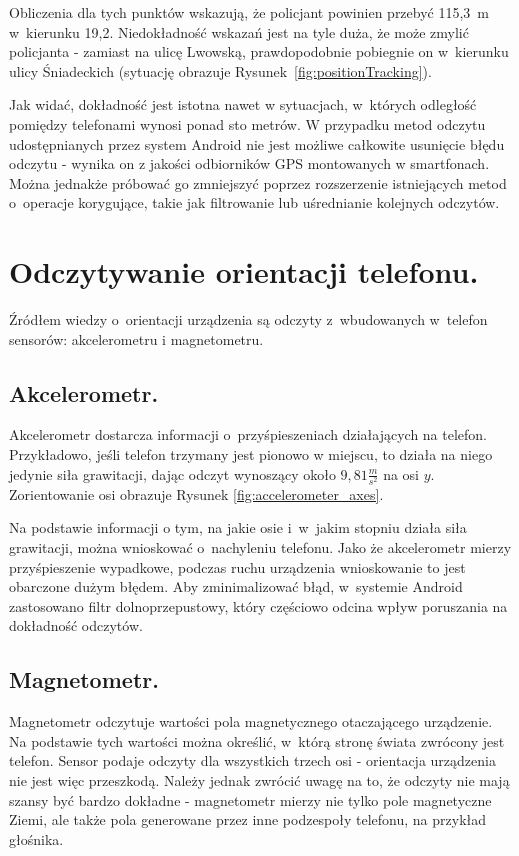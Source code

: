 \documentclass[a4paper,twocolumn,11pt]{article}
\begin{document}
 Obliczenia dla tych punktów wskazują, że policjant powinien przebyć 115,3~m w~kierunku 19,2\textdegree.
 Niedokładność wskazań jest na tyle duża, że może zmylić policjanta - zamiast na ulicę Lwowską, prawdopodobnie pobiegnie on w~kierunku ulicy Śniadeckich (sytuację obrazuje Rysunek~\ref{fig:positionTracking}).


 
 Jak widać, dokładność jest istotna nawet w sytuacjach, w~których odległość pomiędzy telefonami wynosi ponad sto metrów.
 W przypadku metod odczytu udostępnianych przez system Android nie jest możliwe całkowite usunięcie błędu odczytu - wynika on z jakości odbiorników GPS montowanych w smartfonach. Można jednakże próbować go zmniejszyć poprzez rozszerzenie istniejących metod o~operacje korygujące, takie jak filtrowanie lub uśrednianie kolejnych odczytów.




\section{Odczytywanie orientacji telefonu.} \label{sec:orientation_tracking}

Źródłem wiedzy o~orientacji urządzenia są odczyty z~wbudowanych w~telefon sensorów: akcelerometru i magnetometru.


\subsection{Akcelerometr.}
 Akcelerometr dostarcza informacji o~przyśpieszeniach działających na telefon.
 Przykładowo, jeśli telefon trzymany jest pionowo w miejscu, to działa na niego jedynie siła grawitacji, dając odczyt wynoszący około $9,81\frac{m}{s^2}$ na osi $y$.
 Zorientowanie osi obrazuje Rysunek \ref{fig:accelerometer_axes}.
 
 

 Na podstawie informacji o tym, na jakie osie i~w~jakim stopniu działa siła grawitacji, można wnioskować o~nachyleniu telefonu.
 Jako że akcelerometr mierzy przyśpieszenie wypadkowe, podczas ruchu urządzenia wnioskowanie to jest obarczone dużym błędem.
 Aby zminimalizować błąd, w~systemie Android zastosowano filtr dolnoprzepustowy, który częściowo odcina wpływ poruszania na dokładność odczytów.


\subsection{Magnetometr.}
 Magnetometr odczytuje wartości pola magnetycznego otaczającego urządzenie.
 Na podstawie tych wartości można określić, w~którą stronę świata zwrócony jest telefon.
 Sensor podaje odczyty dla wszystkich trzech osi - orientacja urządzenia nie jest więc przeszkodą.
 Należy jednak zwrócić uwagę na to, że odczyty nie mają szansy być bardzo dokładne - magnetometr mierzy nie tylko pole magnetyczne Ziemi, ale także pola generowane przez inne podzespoły telefonu, na przykład głośnika.\\
\end{document}
